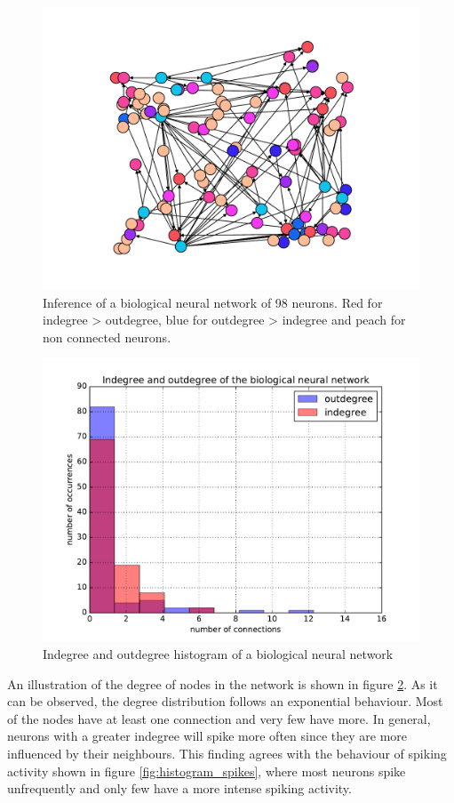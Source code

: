 \begin{figure}
	\centering
	\includegraphics[width=0.8\linewidth]{crcns_4_50_xy.pdf}
	\caption{Inference of a biological neural network of 98 neurons. Red for indegree > outdegree, blue for outdegree > indegree and peach for non connected neurons.}
	\label{fig:crcns_4_network}
\end{figure}

\begin{figure}
	\centering
	\includegraphics[width=0.8\linewidth]{degree_histogram_real_network.pdf}
	\caption{Indegree and outdegree histogram of a biological neural network}
	\label{fig:degree_histogram}
\end{figure}

An illustration of the degree of nodes in the network is shown in figure \ref{fig:degree_histogram}. As it can be observed, the degree distribution follows an exponential behaviour. Most of the nodes have at least one connection and very few have more. In general, neurons with a greater indegree will spike more often since they are more influenced by their neighbours. This finding agrees with the behaviour of spiking activity shown in figure \ref{fig:histogram_spikes}, where most neurons spike unfrequently and only few have a more intense spiking activity.\\

